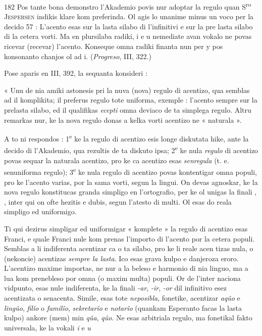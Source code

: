 \begin{VUpage}[186]{182}
Pos tante bona demonstro l'Akademio povis nur adoptar\nl
la regulo quan S\textsuperscript{ro} \textsc{Jespersen} indikis klare kom preferinda.\nl
Ol agis lo unanime minus un voco per la decido 57 :\nl
L'acento esas sur la lasta silabo di l'infinitivi e sur la pre\cc
lasta silabo di la cetera vorti. Ma en plursilaba radiki, i e u\nl
nemediate avan vokalo ne povas ricevar (recevar) l'acento.\nl
Konseque omna radiki finanta nun per y pos konsonanto\nl
chanjos ol ad i. (\textit{Progreso}, III, 322.)

Pose aparis en III, 392, la sequanta konsideri :

« Unu de nia amiki astonesis pri la nuva (nova) regulo\nl
di acentizo, qua semblas ad il komplikita; il preferus regulo\nl
tote uniforma, exemple : l'acento sempre sur la prelasta\nl
silabo, ed il qualifikas \textit{ecepti} omna deviaco de ta simplega\nl
regulo. Altru remarkas nur, ke la nova regulo donas a kelka\nl
vorti acentizo ne « naturala ».

A to ni respondos : 1\textsuperscript{e} ke la regulo di acentizo esis longe\nl
diskutata hike, ante la decido di l'Akademio, qua rezultis\nl
de ta diskuto ipsa; 2\textsuperscript{e} ke nula \textit{regulo} di acentizo povas\nl
sequar la naturala acentizo, pro ke ca acentizo esas \textit{senregula}\nl
(t. e. senuniforma regulo); 3\textsuperscript{e} ke nula regulo di acentizo\nl
povas kontentigar omna populi, pro ke l'acento varias, por\nl
la sama vorti, segun la lingui. On devas agnoskar, ke la\nl
nova regulo konstitucas granda simpligo en l'ortografio, per\nl
ke ol unigas la finali , , inter qui on ofte hezitis e\nl
dubis, segun l'atesto di multi. Ol esas do reala simpligo ed\nl
uniformigo.

Ti qui dezirus simpligar ed uniformigar « komplete »\nl
la regulo di acentizo esas Franci, e quale Franci nule kom\cc
prenas l'importo di l'acento por la cetera populi. Semblas\nl
a li indiferenta acentizar ca o ta silabo, pro ke li reale acen\cc
tizas nula, o (nekoncie) acentizas \textit{sempre la lasta}. Ico esas\nl
grava kulpo e danjeroza eroro. L'acentizo maxime importas,\nl
ne nur a la beleso e harmonio di nia linguo, ma a lua kom\cc
prenebleso por omna (o maxim multa) populi. Or de l'inter\cc
naciona vidpunto, esas nule indiferenta, ke la finali \textit{-ar}, \textit{-ir},\nl
\textit{-or} dil infinitivo esez acentizata o senacenta. Simile, esas\nl
tote \textit{neposibla}, fonetike, acentizar \textit{aqûo} e \textit{lingûo}, \textit{filîo} o\nl
\textit{familîo}, \textit{sekretarîo} e \textit{notarîo} (quankam Esperanto facas la\nl
lasta kulpo) ankore (mem) min \textit{qûa}, \textit{qûo}. Ne esas arbitriala\nl
regulo, ma fonetikal fakto universala, ke la vokali \textit{i} e \textit{u}\nl
\end{VUpage}

